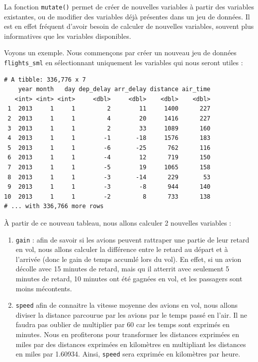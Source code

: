 \documentclass[a4paperpaper,]{article}
\newenvironment{Shaded}{\begin{snugshade}}{\end{snugshade}}
\newcommand{\KeywordTok}[1]{\textcolor[rgb]{0.13,0.29,0.53}{\textbf{#1}}}
\newcommand{\StringTok}[1]{\textcolor[rgb]{0.31,0.60,0.02}{#1}}
\newcommand{\OperatorTok}[1]{\textcolor[rgb]{0.81,0.36,0.00}{\textbf{#1}}}
\newcommand{\NormalTok}[1]{#1}
\providecommand{\tightlist}{%
  \setlength{\itemsep}{0pt}\setlength{\parskip}{0pt}}
\theoremstyle{definition}
\theoremstyle{definition}
\theoremstyle{definition}
\theoremstyle{remark}
\begin{document}
La fonction \texttt{mutate()} permet de créer de nouvelles variables à
partir des variables existantes, ou de modifier des variables déjà
présentes dans un jeu de données. Il est en effet fréquent d'avoir
besoin de calculer de nouvelles variables, souvent plus informatives que
les variables disponibles.

Voyons un exemple. Nous commençons par créer un nouveau jeu de données
\texttt{flights\_sml} en sélectionnant uniquement les variables qui nous
seront utiles :

\begin{Shaded}
\end{Shaded}

\begin{verbatim}
# A tibble: 336,776 x 7
    year month   day dep_delay arr_delay distance air_time
   <int> <int> <int>     <dbl>     <dbl>    <dbl>    <dbl>
 1  2013     1     1         2        11     1400      227
 2  2013     1     1         4        20     1416      227
 3  2013     1     1         2        33     1089      160
 4  2013     1     1        -1       -18     1576      183
 5  2013     1     1        -6       -25      762      116
 6  2013     1     1        -4        12      719      150
 7  2013     1     1        -5        19     1065      158
 8  2013     1     1        -3       -14      229       53
 9  2013     1     1        -3        -8      944      140
10  2013     1     1        -2         8      733      138
# ... with 336,766 more rows
\end{verbatim}

À partir de ce nouveau tableau, nous allons calculer 2 nouvelles
variables :

\begin{enumerate}
\def\labelenumi{\arabic{enumi}.}
\tightlist
\item
  \texttt{gain} : afin de savoir si les avions peuvent rattraper une
  partie de leur retard en vol, nous allons calculer la différence entre
  le retard au départ et à l'arrivée (donc le gain de temps accumlé lors
  du vol). En effet, si un avion décolle avec 15 minutes de retard, mais
  qu il atterrit avec seulement 5 minutes de retard, 10 minutes ont été
  gagnées en vol, et les passagers sont moins mécontents.
\item
  \texttt{speed} afin de connaitre la vitesse moyenne des avions en vol,
  nous allons diviser la distance parcourue par les avions par le temps
  passé en l'air. Il ne faudra pas oublier de multiplier par 60 car les
  temps sont exprimés en minutes. Nous en profiterons pour transformer
  les distances exprimées en miles par des distances exprimées en
  kilomètres en multipliant les distances en miles par 1.60934. Ainsi,
  \texttt{speed} sera exprimée en kilomètres par heure.
\end{enumerate}
\end{document}
